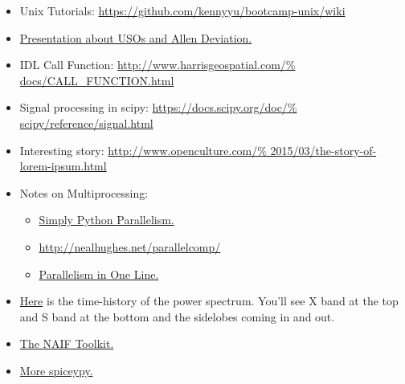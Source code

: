 \documentclass[crop=false,class=book]{standalone}
\begin{document}
\begin{itemize}[itemsep=0pt]
\begin{itemize}
                                       {Notes on Splines from SciPy.}
                        \end{itemize}
                        \item Unix Tutorials:
                            \url{https://github.com/kennyyu/bootcamp-unix/wiki}
                        \item \href{https://websites.isae-supaero.fr/%
                                    IMG/pdf/uso-toulouse.pdf}
                                   {Presentation about USOs and Allen Deviation.}
                        \item IDL Call Function:
                              \url{http://www.harrisgeospatial.com/%
                                   docs/CALL_FUNCTION.html}
                        \item Signal processing in scipy:
                              \url{https://docs.scipy.org/doc/%
                                   scipy/reference/signal.html}
                        \item Interesting story:
                              \url{http://www.openculture.com/%
                                   2015/03/the-story-of-lorem-ipsum.html}
                        \item Notes on Multiprocessing:
                        \begin{itemize}
                            \item \href{https://stsievert.com/blog/2014/07/30/%
                                        simple-python-parallelism/}
                                       {Simply Python Parallelism.}
                            \item \url{http://nealhughes.net/parallelcomp/}
                            \item \href{http://chriskiehl.com/article/%
                                        parallelism-in-one-line/}
                                       {Parallelism in One Line.}
                        \end{itemize}
                        \item \href{https://www.youtube.com/%
                                    watch?time_continue=2&v=s-Xw6i61N9o}
                                   {Here}
                              is the time-history of the power spectrum.
                              You'll see X band at the top and S band at
                              the bottom and the sidelobes coming in and out.
                        \item \href{https://naif.jpl.nasa.gov/naif/toolkit.html}
                                   {The NAIF Toolkit.}
                        \item \href{http://spiceypy.readthedocs.io/en/%
                                    master/exampleone.html}
                                   {More spiceypy.}
                    \end{itemize}
\end{document}
